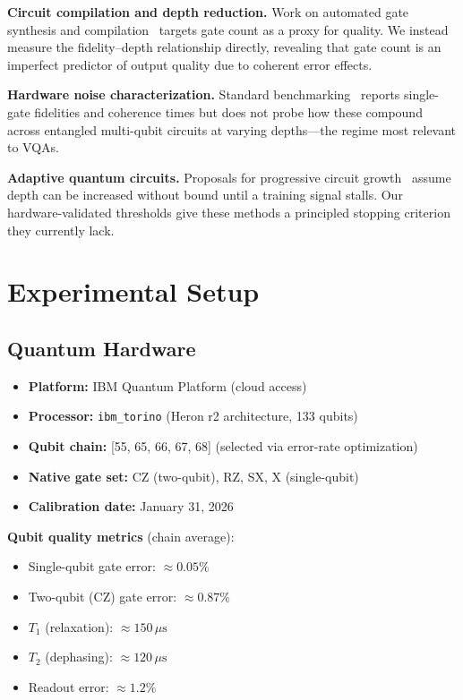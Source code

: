 \documentclass[12pt,letterpaper]{article}
\begin{document}
\textbf{Circuit compilation and depth reduction.}
Work on automated gate synthesis and
compilation~\cite{nam2018automated,farhi2018classification} targets gate count as a
proxy for quality. We instead measure the fidelity--depth relationship directly,
revealing that gate count is an imperfect predictor of output quality due to coherent
error effects.

\textbf{Hardware noise characterization.}
Standard benchmarking~\cite{gambetta2017building,magesan2011scalable} reports
single-gate fidelities and coherence times but does not probe how these compound
across entangled multi-qubit circuits at varying depths---the regime most relevant
to VQAs.

\textbf{Adaptive quantum circuits.}
Proposals for progressive circuit
growth~\cite{grant2019initialization,skolik2021layerwise} assume depth can be
increased without bound until a training signal stalls. Our hardware-validated
thresholds give these methods a principled stopping criterion they currently lack.

\section{Experimental Setup}

\subsection{Quantum Hardware}

\begin{itemize}
  \item \textbf{Platform:} IBM Quantum Platform (cloud access)
  \item \textbf{Processor:} \texttt{ibm\_torino} (Heron r2 architecture, 133 qubits)
  \item \textbf{Qubit chain:} [55, 65, 66, 67, 68] (selected via error-rate
        optimization)
  \item \textbf{Native gate set:} CZ (two-qubit), RZ, SX, X (single-qubit)
  \item \textbf{Calibration date:} January 31, 2026
\end{itemize}

\noindent\textbf{Qubit quality metrics} (chain average):
\begin{itemize}
  \item Single-qubit gate error: $\approx 0.05\%$
  \item Two-qubit (CZ) gate error: $\approx 0.87\%$
  \item $T_1$ (relaxation): $\approx 150\,\mu\text{s}$
  \item $T_2$ (dephasing): $\approx 120\,\mu\text{s}$
  \item Readout error: $\approx 1.2\%$
\end{itemize}
\end{document}
